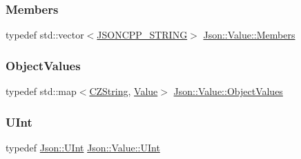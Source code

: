 \subsubsection{\texorpdfstring{Members}{Members}}
{\footnotesize\ttfamily typedef std\+::vector$<$\hyperlink{json_8h_a1e723f95759de062585bc4a8fd3fa4be_a1e723f95759de062585bc4a8fd3fa4be}{J\+S\+O\+N\+C\+P\+P\+\_\+\+S\+T\+R\+I\+NG}$>$ \hyperlink{classJson_1_1Value_a9ae9069983fc38f1928d76f9c79ac64d_a9ae9069983fc38f1928d76f9c79ac64d}{Json\+::\+Value\+::\+Members}}

\mbox{\label{classJson_1_1Value_a08b6c80c3af7071d908dabf044de5388_a08b6c80c3af7071d908dabf044de5388}} 
\subsubsection{\texorpdfstring{Object\+Values}{ObjectValues}}
{\footnotesize\ttfamily typedef std\+::map$<$\hyperlink{classJson_1_1Value_1_1CZString}{C\+Z\+String}, \hyperlink{classJson_1_1Value}{Value}$>$ \hyperlink{classJson_1_1Value_a08b6c80c3af7071d908dabf044de5388_a08b6c80c3af7071d908dabf044de5388}{Json\+::\+Value\+::\+Object\+Values}}

\mbox{\label{classJson_1_1Value_a0933d59b45793ae4aade1757c322a98d_a0933d59b45793ae4aade1757c322a98d}} 
\subsubsection{\texorpdfstring{U\+Int}{UInt}}
{\footnotesize\ttfamily typedef \hyperlink{namespaceJson_a800fb90eb6ee8d5d62b600c06f87f7d4_a800fb90eb6ee8d5d62b600c06f87f7d4}{Json\+::\+U\+Int} \hyperlink{classJson_1_1Value_a0933d59b45793ae4aade1757c322a98d_a0933d59b45793ae4aade1757c322a98d}{Json\+::\+Value\+::\+U\+Int}}

\mbox{\label{classJson_1_1Value_a8b62564be8c087c6d18de180ff4e13e3_a8b62564be8c087c6d18de180ff4e13e3}} 
